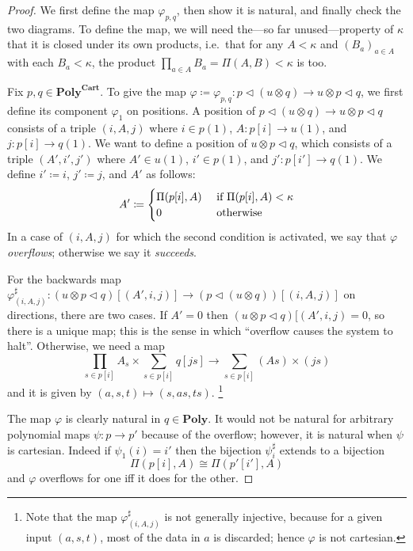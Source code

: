 \documentclass[11pt, one side, article]{memoir}
\theoremstyle{definition}
\theoremstyle{plain}
\newcommand{\Cat}[1]{\mathbf{#1}}%
\newcommand{\tn}[1]{\textnormal{#1}}
\newcommand{\poly}{\Cat{Poly}}
\newcommand{\polycart}{\poly^{\Cat{Cart}}}
\newcommand{\0}{\textsf{0}}
\newcommand{\1}{\tn{\textsf{1}}}
\newcommand{\tri}{\mathbin{\triangleleft}}
\begin{document}
\begin{proof}
We first define the map $\varphi_{p,q}$, then show it is natural, and finally check the two diagrams. To define the map, we will need the---so far unused---property of $\kappa$ that it is closed under its own products, i.e.\ that for any $A<\kappa$ and $(B_a)_{a\in A}$ with each $B_a<\kappa$, the product $\prod_{a\in A}B_a=\Pi(A,B)<\kappa$ is too.

Fix $p,q\in\polycart$. To give the map $\varphi\coloneqq\varphi_{p,q}\colon p\tri(u\otimes q)\to u\otimes p\tri q$, we first define its component $\varphi_1$ on positions. A position of $p\tri(u\otimes q)\to u\otimes p\tri q$ consists of a triple $(i,A,j)$ where $i\in p(1)$, $A\colon p[i]\to u(1)$, and $j\colon p[i]\to q(1)$. We want to define a position of $u\otimes p\tri q$, which consists of a triple $(A',i',j')$ where $A'\in u(1)$, $i'\in p(1)$, and $j'\colon p[i']\to q(1)$. We define $i'\coloneqq i$, $j'\coloneqq j$, and $A'$ as follows:
\begin{equation}\label{eqn.overflow}
  A'\coloneqq
  \begin{cases}
  	\Pi(p[i],A)&\tn{ if }\Pi(p[i],A)<\kappa\\
		0&\tn{ otherwise}
  \end{cases}
\end{equation}
In a case of $(i,A,j)$ for which the second condition is activated, we say that $\varphi$ \emph{overflows}; otherwise we say it \emph{succeeds}.

For the backwards map $\varphi^\sharp_{(i,A,j)}\colon (u\otimes p\tri q)[(A',i,j)]\to(p\tri(u\otimes q))[(i,A,j)]$ on directions, there are two cases. If $A'=0$ then $(u\otimes p\tri q)[(A',i,j)=0$, so there is a unique map; this is the sense in which ``overflow causes the system to halt''. Otherwise, we need a map
\[
\prod_{s\in p[i]}A_s\times\sum_{s\in p[i]}q[js]\to\sum_{s\in p[i]}(A s)\times (js)
\]
and it is given by $(a,s,t)\mapsto(s,as,ts)$.%
\footnote{Note that the map $\varphi^\sharp_{(i,A,j)}$ is not generally injective, because for a given input $(a,s,t)$, most of the data in $a$ is discarded; hence $\varphi$ is not cartesian.}

The map $\varphi$ is clearly natural in $q\in\poly$. It would not be natural for arbitrary polynomial maps $\psi\colon p\to p'$ because of the overflow; however, it is natural when $\psi$ is cartesian. Indeed if $\psi_1(i)=i'$ then the bijection $\psi_i^\sharp$ extends to a bijection
\[\Pi(p[i],A)\cong\Pi(p'[i'],A)\]
and $\varphi$ overflows for one iff it does for the other.


\end{proof}
\end{document}
